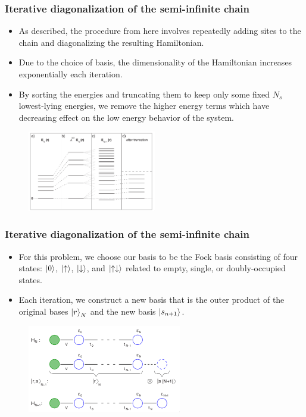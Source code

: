 \documentclass{beamer}
\begin{document}
\begin{frame}
  \frametitle{Iterative diagonalization of the semi-infinite chain}

  \begin{itemize}
  \item As described, the procedure from here involves repeatedly adding sites to the chain and diagonalizing the resulting Hamiltonian.
  \item Due to the choice of basis, the dimensionality of the Hamiltonian increases exponentially each iteration.
  \item By sorting the energies and truncating them to keep only some fixed $N_s$ lowest-lying energies, we remove the higher energy terms which have decreasing effect on the low energy behavior of the system.
  \end{itemize}

  \begin{figure}
    \centering
    \includegraphics[width=0.5\textwidth]{./gfx/truncation.png}
  \end{figure}
\end{frame}

\begin{frame}
  \frametitle{Iterative diagonalization of the semi-infinite chain}

  \begin{itemize}
  \item For this problem, we choose our basis to be the Fock basis consisting of four states: $\ket{0}$, $\ket{\uparrow}$, $\ket{\downarrow}$, and $\ket{\uparrow\downarrow}$ related to empty, single, or doubly-occupied states.
  \item Each iteration, we construct a new basis that is the outer product of the original bases $\ket{r}_N$ and the new basis $\ket{s_{n+1}}$.
  \end{itemize}

  \begin{figure}
    \centering
    \includegraphics[width=0.6\textwidth]{./gfx/outer-product.png}
  \end{figure}
\end{frame}
\end{document}
